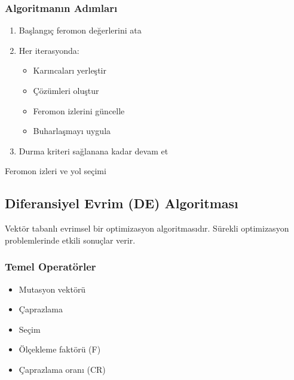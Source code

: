\subsubsection{Algoritmanın Adımları}
\begin{enumerate}
    \item Başlangıç feromon değerlerini ata
    \item Her iterasyonda:
        \begin{itemize}
            \item Karıncaları yerleştir
            \item Çözümleri oluştur
            \item Feromon izlerini güncelle
            \item Buharlaşmayı uygula
        \end{itemize}
    \item Durma kriteri sağlanana kadar devam et
\end{enumerate}

\begin{marginfigure}
\centering
{}
\caption{Feromon izleri ve yol seçimi}
\label{fig:aco_path}
\end{marginfigure}

\subsection{Diferansiyel Evrim (DE) Algoritması}
Vektör tabanlı evrimsel bir optimizasyon algoritmasıdır. Sürekli optimizasyon problemlerinde etkili sonuçlar verir.

\subsubsection{Temel Operatörler}
\begin{itemize}
    \item Mutasyon vektörü
    \item Çaprazlama
    \item Seçim
    \item Ölçekleme faktörü (F)
    \item Çaprazlama oranı (CR)
\end{itemize}

